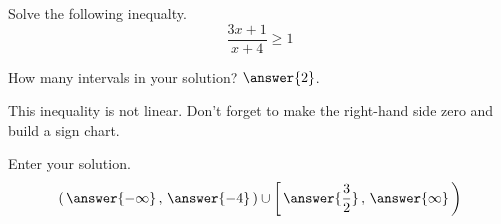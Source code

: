 \documentclass{ximera}
\begin{document}
\begin{exercise}

	Solve the following inequalty.
	\[ \dfrac{3x+1}{x+4} \geq 1 \]
	
	How many intervals in your solution?  $\answer{2}$.
	\begin{hint}
		This inequality is not linear.  Don't forget to make the right-hand side zero and build a sign chart.
	\end{hint}
	
	\begin{exercise}
		Enter your solution.
		\[ \left( \, \answer{-\infty} \, , \, \answer{-4} \, \right) \cup \left[\, \answer{\frac{3}{2}} \, , \, \answer{\infty} \, \right) \]
	\end{exercise}

\end{exercise}
\end{document}
